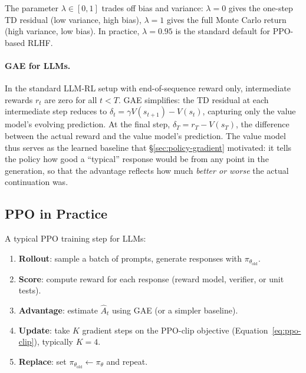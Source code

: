 The parameter $\lambda \in [0, 1]$ trades off bias and variance: $\lambda = 0$ gives the one-step TD residual (low variance, high bias), $\lambda = 1$ gives the full Monte Carlo return (high variance, low bias). In practice, $\lambda = 0.95$ is the standard default for PPO-based RLHF.

\paragraph{GAE for LLMs.} In the standard LLM-RL setup with end-of-sequence reward only, intermediate rewards $r_t$ are zero for all $t < T$. GAE simplifies: the TD residual at each intermediate step reduces to $\delta_t = \gamma V(s_{t+1}) - V(s_t)$, capturing only the value model's evolving prediction. At the final step, $\delta_T = r_T - V(s_T)$, the difference between the actual reward and the value model's prediction. The value model thus serves as the learned baseline that §\ref{sec:policy-gradient} motivated: it tells the policy how good a ``typical'' response would be from any point in the generation, so that the advantage reflects how much \emph{better or worse} the actual continuation was.

\subsection{PPO in Practice}

A typical PPO training step for LLMs:

\begin{enumerate}[nosep]
  \item \textbf{Rollout}: sample a batch of prompts, generate responses with $\pi_{\theta_{\text{old}}}$.
  \item \textbf{Score}: compute reward for each response (reward model, verifier, or unit tests).
  \item \textbf{Advantage}: estimate $\hat{A}_t$ using GAE (or a simpler baseline).
  \item \textbf{Update}: take $K$ gradient steps on the PPO-clip objective (Equation~\ref{eq:ppo-clip}), typically $K = 4$.
  \item \textbf{Replace}: set $\pi_{\theta_{\text{old}}} \leftarrow \pi_\theta$ and repeat.
\end{enumerate}

